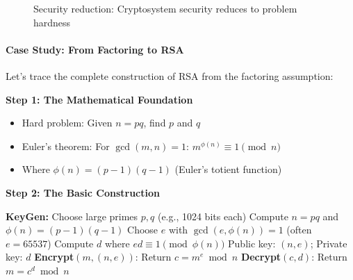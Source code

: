 \documentclass[11pt,a4paper]{article}
\begin{document}
\begin{figure}[h]
\centering
{}
\caption{Security reduction: Cryptosystem security reduces to problem hardness}
\end{figure}

\paragraph{Case Study: From Factoring to RSA}

Let's trace the complete construction of RSA from the factoring assumption:

\textbf{Step 1: The Mathematical Foundation}
\begin{itemize}
    \item Hard problem: Given $n = pq$, find $p$ and $q$
    \item Euler's theorem: For $\gcd(m, n) = 1$: $m^{\phi(n)} \equiv 1 \pmod{n}$
    \item Where $\phi(n) = (p-1)(q-1)$ (Euler's totient function)
\end{itemize}

\textbf{Step 2: The Basic Construction}
\begin{algorithm}
\caption{Textbook RSA Construction}
\begin{algorithmic}
\State \textbf{KeyGen:}
\State \quad Choose large primes $p, q$ (e.g., 1024 bits each)
\State \quad Compute $n = pq$ and $\phi(n) = (p-1)(q-1)$
\State \quad Choose $e$ with $\gcd(e, \phi(n)) = 1$ (often $e = 65537$)
\State \quad Compute $d$ where $ed \equiv 1 \pmod{\phi(n)}$
\State \quad Public key: $(n, e)$; Private key: $d$
\State
\State \textbf{Encrypt}$(m, (n,e))$:
\State \quad Return $c = m^e \bmod n$
\State
\State \textbf{Decrypt}$(c, d)$:
\State \quad Return $m = c^d \bmod n$
\end{algorithmic}
\end{algorithm}
\end{document}
